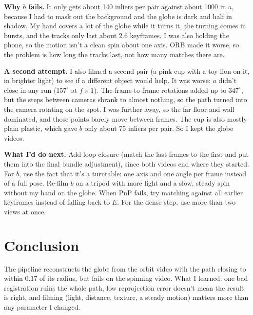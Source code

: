 \documentclass[conference]{assets/latex/IEEEtran}
\begin{document}
\textbf{Why $b$ fails.} It only gets about 140 inliers per pair against about
1000 in $a$, because I had to mask out the background and the globe is dark
and half in shadow. My hand covers a lot of the globe while it turns it, the
turning comes in bursts, and the tracks only last about 2.6 keyframes. I was
also holding the phone, so the motion isn't a clean spin about one axis. ORB
made it worse, so the problem is how long the tracks last, not how many
matches there are.

\textbf{A second attempt.} I also filmed a second pair (a pink cup with a toy
lion on it, in brighter light) to see if a different object would help. It
was worse: $a$ didn't close in any run ($157^\circ$ at $f\times1$). The
frame-to-frame rotations added up to $347^\circ$, but the steps between
cameras shrank to almost nothing, so the path turned into the camera rotating
on the spot. I was further away, so the far floor and wall dominated, and
those points barely move between frames. The cup is also mostly plain
plastic, which gave $b$ only about 75 inliers per pair. So I kept the globe
videos.

\textbf{What I'd do next.} Add loop closure (match the last frames to the
first and put them into the final bundle adjustment), since both videos end
where they started. For $b$, use the fact that it's a turntable: one axis and
one angle per frame instead of a full pose. Re-film $b$ on a tripod with more
light and a slow, steady spin without my hand on the globe. When PnP fails,
try matching against all earlier keyframes instead of falling back to $E$.
For the dense step, use more than two views at once.

\section{Conclusion}
The pipeline reconstructs the globe from the orbit video with the path
closing to within 0.17 of its radius, but fails on the spinning video. What I
learned: one bad registration ruins the whole path, low reprojection error
doesn't mean the result is right, and filming (light, distance, texture, a
steady motion) matters more than any parameter I changed.

\nocite{foundationsCVbook}
\printbibliography
\end{document}
